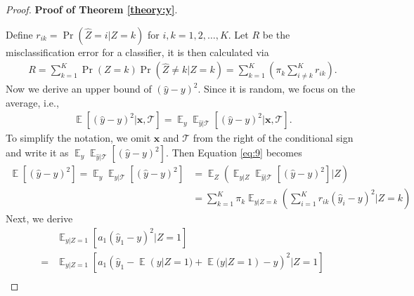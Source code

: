 \documentclass[12pt]{article}
\DeclareMathOperator{\E}{\mathbb{E}}
\begin{document}
\begin{proof}{\textbf{Proof of Theorem \ref{theory:y}}.}{}

Define $r_{ik}=\Pr(\hat{Z}=i|Z=k)$ for $i, k = 1, 2, \ldots, K$.
Let $R$ be the misclassification error for a classifier, it is then calculated via
\begin{align}\label{eq:R}
R = \sum_{k=1}^K \Pr(Z=k) \Pr(\hat{Z} \neq k|Z=k) = \sum_{k=1}^K \left( \pi_k \sum_{i \neq k}^K r_{ik} \right).
\end{align}
Now we derive an upper bound of $(\hat{y} - y)^2$.
Since it is random, we focus on the average, i.e.,
\begin{align}\label{eq:9}
\E[(\hat{y}-y)^2|\bm x, \mathcal{T}] = \E_y \E_{\hat{y}|\mathcal{T}} \left[(\hat{y}-y)^2|\bm x, \mathcal{T}\right].
\end{align}
To simplify the notation, we omit $\bm x$ and $\mathcal{T}$ from the right of the conditional sign and write it as $\E_y\E_{\hat{y}|\mathcal{T}}\left[(\hat{y}-y)^2\right]$.
Then Equation \eqref{eq:9} becomes
\begin{align*}
\E[(\hat{y}-y)^2] = \E_y \E_{\hat{y}|\mathcal{T}}\left[(\hat{y}-y)^2 \right] &= \E_Z (\E_{y|Z} \E_{\hat{y}|\mathcal{T}}\left[(\hat{y}-y)^2 \right] | Z) \\
&= \sum_{k=1}^K \pi_k \E_{y|Z=k} \left( \sum_{i=1}^K r_{ik} (\hat{y}_i-y)^2 | Z = k \right)
\end{align*}
Next, we derive
\begin{align*}
&\E_{y|Z=1}\left[a_1(\hat{y}_1-y)^2|Z=1\right]  \\
=& \E_{y|Z=1}\left[a_1(\hat{y}_1-\E(y|Z=1)+\E(y|Z=1)-y)^2|Z=1\right]\\

\end{align*}
\end{proof}
\end{document}
